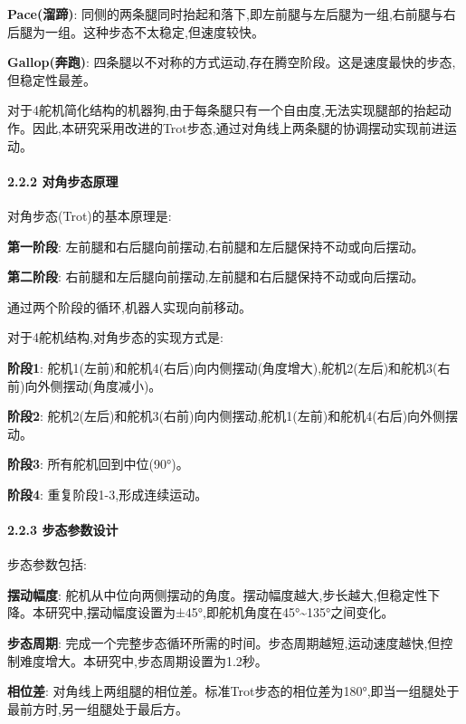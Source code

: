 \documentclass[
]{article}
\begin{document}
\textbf{Pace(溜蹄)}:
同侧的两条腿同时抬起和落下,即左前腿与左后腿为一组,右前腿与右后腿为一组。这种步态不太稳定,但速度较快。

\textbf{Gallop(奔跑)}:
四条腿以不对称的方式运动,存在腾空阶段。这是速度最快的步态,但稳定性最差。

对于4舵机简化结构的机器狗,由于每条腿只有一个自由度,无法实现腿部的抬起动作。因此,本研究采用改进的Trot步态,通过对角线上两条腿的协调摆动实现前进运动。

\hypertarget{ux5bf9ux89d2ux6b65ux6001ux539fux7406}{%
\paragraph{2.2.2
对角步态原理}\label{ux5bf9ux89d2ux6b65ux6001ux539fux7406}}

对角步态(Trot)的基本原理是:

\textbf{第一阶段}:
左前腿和右后腿向前摆动,右前腿和左后腿保持不动或向后摆动。

\textbf{第二阶段}:
右前腿和左后腿向前摆动,左前腿和右后腿保持不动或向后摆动。

通过两个阶段的循环,机器人实现向前移动。

对于4舵机结构,对角步态的实现方式是:

\textbf{阶段1}:
舵机1(左前)和舵机4(右后)向内侧摆动(角度增大),舵机2(左后)和舵机3(右前)向外侧摆动(角度减小)。

\textbf{阶段2}:
舵机2(左后)和舵机3(右前)向内侧摆动,舵机1(左前)和舵机4(右后)向外侧摆动。

\textbf{阶段3}: 所有舵机回到中位(90°)。

\textbf{阶段4}: 重复阶段1-3,形成连续运动。

\hypertarget{ux6b65ux6001ux53c2ux6570ux8bbeux8ba1}{%
\paragraph{2.2.3
步态参数设计}\label{ux6b65ux6001ux53c2ux6570ux8bbeux8ba1}}

步态参数包括:

\textbf{摆动幅度}:
舵机从中位向两侧摆动的角度。摆动幅度越大,步长越大,但稳定性下降。本研究中,摆动幅度设置为±45°,即舵机角度在45°\textasciitilde135°之间变化。

\textbf{步态周期}:
完成一个完整步态循环所需的时间。步态周期越短,运动速度越快,但控制难度增大。本研究中,步态周期设置为1.2秒。

\textbf{相位差}:
对角线上两组腿的相位差。标准Trot步态的相位差为180°,即当一组腿处于最前方时,另一组腿处于最后方。
\end{document}
